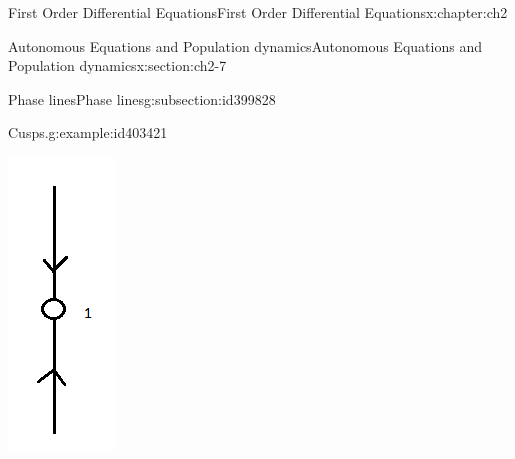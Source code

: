 \documentclass[oneside,10pt,]{book}
\numberwithin{equation}{section}
\numberwithin{equation}{section}
\begin{document}
\begin{chapterptx}{First Order Differential Equations}{}{First Order Differential Equations}{}{}{x:chapter:ch2}
\begin{sectionptx}{Autonomous Equations and Population dynamics}{}{Autonomous Equations and Population dynamics}{}{}{x:section:ch2-7}
\begin{subsectionptx}{Phase lines}{}{Phase lines}{}{}{g:subsection:id399828}
\begin{example}{Cusps.}{g:example:id403421}
\begin{image}{0.35}{0.3}{0.35}
\includegraphics[width=\linewidth]{images/1.6-Phase3.png}

\end{image}
\end{example}
\end{subsectionptx}
\end{sectionptx}
\end{chapterptx}
\end{document}
